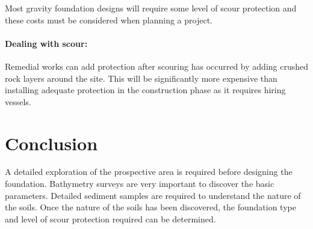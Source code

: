 \documentclass[12pt]{article} %
\begin{document}
Most gravity foundation designs will require some level of scour protection and these costs must be considered when planning a project.

\paragraph{Dealing with scour:}
Remedial works can add protection after scouring has occurred by adding crushed rock layers around the site. This will be significantly more expensive than installing adequate protection in the construction phase as it requires hiring vessels.


\section{Conclusion} %
A detailed exploration of the prospective area is required before designing the foundation. Bathymetry surveys are very important to discover the basic parameters. Detailed sediment samples are required to understand the nature of the soils. 
Once the nature of the soils has been discovered, the foundation type and level of scour protection required can be determined.

\printbibliography

\end{document}
